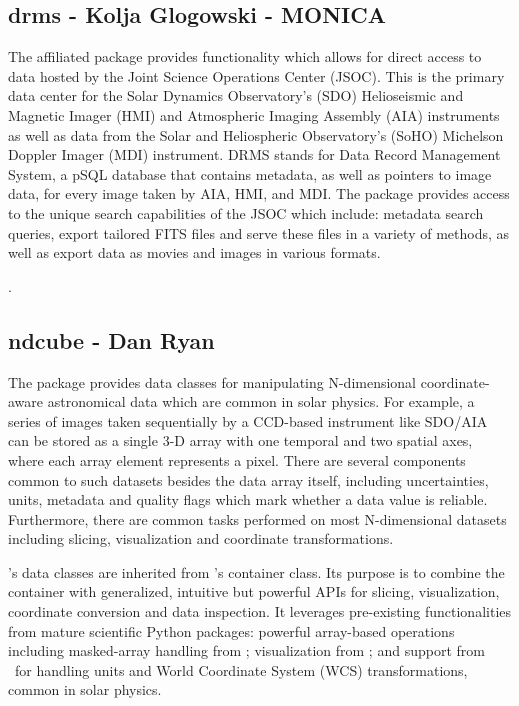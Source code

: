 \subsection{drms - Kolja Glogowski - MONICA}
\label{sec:drms}

The  affiliated package provides functionality which allows for direct access to data hosted by the Joint Science Operations Center (JSOC). This is the primary data center for the Solar Dynamics Observatory’s (SDO) Helioseismic and Magnetic Imager (HMI) and Atmospheric Imaging Assembly (AIA) instruments as well as data from the Solar and Heliospheric Observatory's (SoHO) Michelson Doppler Imager (MDI) instrument. DRMS stands for Data Record Management System, a pSQL database that contains metadata, as well as pointers to image data, for every image taken by AIA, HMI, and MDI. The  package provides access to the unique search capabilities of the JSOC which include: metadata search queries, export tailored FITS files and serve these files in a variety of methods, as well as export data as movies and images in various formats.

.

\subsection{ndcube - Dan Ryan}
\label{sec:ndcube}
The  package provides data classes for manipulating N-dimensional coordinate-aware astronomical data which are common in solar physics.
For example, a series of images taken sequentially by a CCD-based instrument like SDO/AIA can be stored as a single 3-D array with one temporal and two spatial axes, where each array element represents a pixel.
There are several components common to such datasets besides the data array itself, including uncertainties, units, metadata and quality flags which mark whether a data value is reliable.
Furthermore, there are common tasks performed on most N-dimensional datasets including slicing, visualization and coordinate transformations.

's data classes are inherited from \astropy's  container class.  Its purpose is to combine the container with generalized, intuitive but powerful APIs for slicing, visualization, coordinate conversion and data inspection.
It leverages pre-existing functionalities from mature scientific Python packages: powerful array-based operations including masked-array handling from ; visualization from ; and support from \astropy\ for handling units and World Coordinate System (WCS) transformations, common in solar physics.

